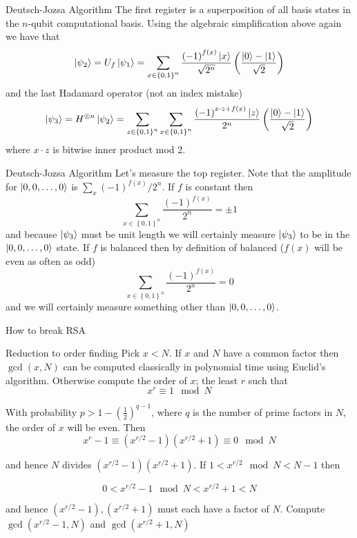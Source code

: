 \documentclass{beamer}
\begin{document}
\begin{frame}{Deutsch-Jozsa Algorithm}
The first register is a superposition of all basis states in the $n$-qubit
computational basis. Using the algebraic simplification above again we have
that 
\[
\Ket{\psi_{2}}=U_{f}\Ket{\psi_{1}}=\sum_{x\in\left\{ 0,1\right\} ^{n}}\frac{\left(-1\right)^{f\left(x\right)}\Ket{x}}{\sqrt{2^{n}}}\left(\frac{\Ket{0}-\Ket{1}}{\sqrt{2}}\right)
\]
and the last Hadamard operator (not an index mistake)
\[
\Ket{\psi_{3}}=H^{\otimes n}\Ket{\psi_{2}}=\sum_{z\in\left\{ 0,1\right\} ^{n}}\sum_{x\in\left\{ 0,1\right\} ^{n}}\frac{\left(-1\right)^{x\cdot z+f\left(x\right)}\Ket{z}}{2^{n}}\left(\frac{\Ket{0}-\Ket{1}}{\sqrt{2}}\right)
\]
where $x\cdot z$ is bitwise inner product mod 2.  
\end{frame}

\begin{frame}{Deutsch-Jozsa Algorithm}
Let's measure the
top register. Note that the amplitude for $\Ket{0,0,\dots,0}$
is $\sum_{x}\left(-1\right)^{f\left(x\right)}/2^{n}$. If $f$ is
constant then
\[
\sum_{x\in\left\{ 0,1\right\} ^{n}}\frac{\left(-1\right)^{f\left(x\right)}}{2^{n}}=\pm1
\]
and because $\Ket{\psi_{3}}$ must be unit length we will certainly measure
$\Ket{\psi_{3}}$ to be in the $\Ket{0,0,\dots,0}$ state. If $f$ is
balanced then by definition of balanced ($f\left(x\right)$ will be
even as often as odd) 
\[
\sum_{x\in\left\{ 0,1\right\} ^{n}}\frac{\left(-1\right)^{f\left(x\right)}}{2^{n}}=0
\]
and we will certainly measure something other than $\Ket{0,0,\dots,0}$.
\end{frame}


\begin{frame}{\textbf{}}
\begin{center} \Huge How to break RSA \end{center}
\end{frame}

\begin{frame}{Reduction to order finding}
Pick $x<N$. If $x$ and $N$ have a common factor then $\gcd(x,N)$ can be computed classically in polynomial time using Euclid's algorithm. Otherwise compute the order of $x$; the least $r$ such that
\[
x^r\equiv 1 \mod N
\]

With probability $p>1-\left(\frac{1}{2}\right)^{q-1}$, where $q$ is the number of prime factors in $N$, the order of $x$ will be even. Then
\[
x^r-1\equiv \left(x^{r/2}-1\right)\left(x^{r/2}+1\right)\equiv 0 \mod N
\]

and hence $N$ divides $\left(x^{r/2}-1\right)\left(x^{r/2}+1\right)$. If $1<x^{r/2}\mod N<N-1$ then 

\[
0<x^{r/2}-1\mod N<x^{r/2}+1<N
\]

and hence $\left(x^{r/2}-1\right),\left(x^{r/2}+1\right)$ must each have a factor of $N$. Compute $\gcd(x^{r/2}-1,N)$ and $\gcd(x^{r/2}+1,N)$ 

\end{frame}
\end{document}
